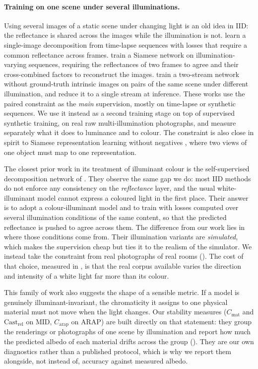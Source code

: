 \paragraph{Training on one scene under several illuminations.}
Using several images of a static scene under changing light is an old idea in IID:
the reflectance is shared across the images while the illumination is not.
 learn a single-image decomposition from time-lapse sequences
with losses that require a common reflectance across frames.
 train a Siamese network on illumination-varying
sequences, requiring the reflectances of two frames to agree and their cross-combined
factors to reconstruct the images.
 train a two-stream network without ground-truth intrinsic images on
pairs of the same scene under different illumination, and reduce it to a single stream at
inference. These works use the paired constraint as the \emph{main} supervision, mostly on
time-lapse or synthetic sequences. We use it instead as a second training stage on top of
supervised synthetic training, on real raw multi-illumination photographs, and measure
separately what it does to luminance and to colour. The constraint is also close in spirit
to Siamese representation learning without negatives , where two
views of one object must map to one representation.

The closest prior work in its treatment of illuminant colour is the self-supervised
decomposition network of .
They observe the same gap we do: most IID methods do not enforce any consistency
on the \emph{reflectance} layer, and the usual white-illuminant model cannot
express a coloured light in the first place.
Their answer is to adopt a colour-illuminant model and to train with losses
computed over several illumination conditions of the same content, so that the
predicted reflectance is pushed to agree across them.
The difference from our work lies in where those conditions come from.
Their illumination variants are \emph{simulated}, which makes the supervision
cheap but ties it to the realism of the simulator.
We instead take the constraint from real photographs of real rooms
(). The cost of that choice, measured in
, is that the real corpus available varies the direction and
intensity of a white light far more than its colour.

This family of work also suggests the shape of a sensible metric.
If a model is genuinely illuminant-invariant, the chromaticity it assigns to one
physical material must not move when the light changes.
Our stability measures ($C_{\text{mat}}$ and $\text{Cast}_{\text{rel}}$ on MID,
$C_{\text{arap}}$ on ARAP) are built directly on that statement: they group the
renderings or photographs of one scene by illumination and report how much the
predicted albedo of each material drifts across the group ().
They are our own diagnostics rather than a published protocol, which is why we
report them alongside, not instead of, accuracy against measured albedo.


